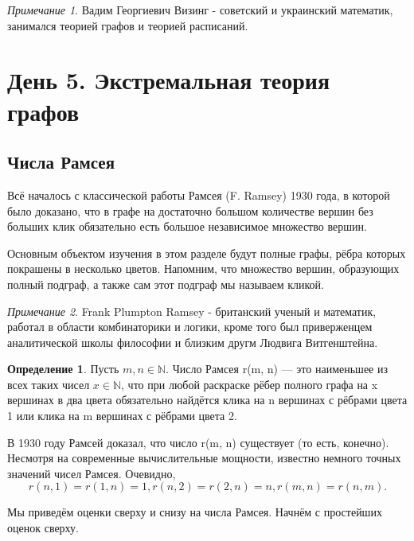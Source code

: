 \documentclass{article}
\theoremstyle{definition}
\newtheorem{definition}{Определение}[section]
\theoremstyle{remark}
\newtheorem*{remark}{Примечание}
\begin{document}
\begin{remark}
    Вадим Георгиевич Визинг - советский и украинский математик, занимался теорией графов и теорией расписаний.
\end{remark}
\section{День 5. Экстремальная теория графов}

\subsection{Числа Рамсея}

Всё началось с классической работы Рамсея (F. Ramsey) 1930 года, в которой было доказано, что в графе на достаточно большом количестве
вершин без больших клик обязательно есть большое независимое множество вершин.

Основным объектом изучения в этом разделе будут полные графы, рёбра которых покрашены в несколько цветов. Напомним, что множество
вершин, образующих полный подграф, а также сам этот подграф мы
называем кликой.

\begin{remark}
    Frank Plumpton Ramsey - британский ученый и математик, работал в области комбинаторики и логики, кроме того был приверженцем аналитической школы философии и близким другм Людвига Витгенштейна.
\end{remark}

\begin{definition}
    Пусть $m, n \in \mathbb{N}$. Число Рамсея r(m, n) — это наименьшее из всех таких чисел $x \in \mathbb{N}$, что при любой раскраске рёбер полного графа на x вершинах в два цвета обязательно найдётся клика на n вершинах с рёбрами цвета 1 или клика на m вершинах с рёбрами   цвета 2.
\end{definition}

В 1930 году Рамсей доказал, что число r(m, n) существует (то есть,
конечно). Несмотря на современные вычислительные мощности, известно немного точных значений чисел Рамсея. Очевидно,
$$
r(n, 1) = r(1, n) = 1, r(n, 2) = r(2, n) = n, r(m, n) = r(n, m).
$$

Мы приведём оценки сверху и снизу на числа Рамсея. Начнём с простейших оценок сверху.
\end{document}
